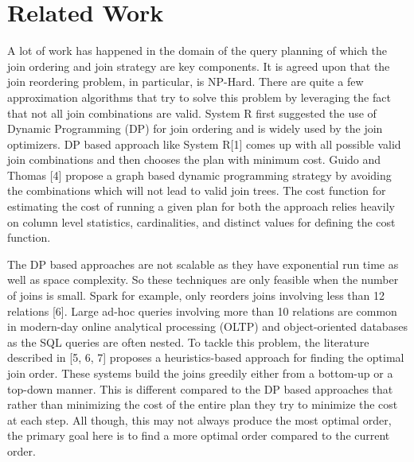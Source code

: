 \section{Related Work}
A lot of work has happened in the domain of the query planning of which the join ordering and join strategy are key components. It is agreed upon that the join reordering problem, in particular, is NP-Hard. There are quite a few approximation algorithms that try to solve this problem by leveraging the fact that not all join combinations are valid. System R \cite{b1} first suggested the use of Dynamic Programming (DP) for join ordering and is widely used by the join optimizers. DP based approach like System R[1] comes up with all possible valid join combinations and then chooses the plan with minimum cost. Guido and Thomas [4] propose a graph based dynamic programming strategy by avoiding the combinations which will not lead to valid join trees. The cost function for estimating the cost of running a given plan for both the approach relies heavily on column level statistics, cardinalities, and distinct values for defining the cost function.

The DP based approaches are not scalable as they have exponential run time as well as space complexity. So these techniques are only feasible when the number of joins is small. Spark for example, only reorders joins involving less than 12 relations [6]. Large ad-hoc queries involving more than 10 relations are common in modern-day online analytical processing (OLTP) and object-oriented databases as the SQL queries are often nested. To tackle this problem,  the literature described in [5, 6, 7] proposes a heuristics-based approach for finding the optimal join order. These systems build the joins greedily either from a bottom-up or a top-down manner. This is different compared to the DP based approaches that rather than minimizing the cost of the entire plan they try to minimize the cost at each step. All though, this may not always produce the most optimal order, the primary goal here is to find a more optimal order compared to the current order.


